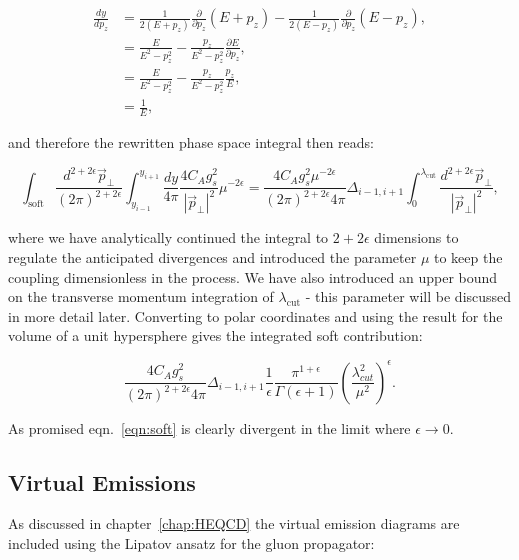 			\begin{align*}
				\frac{dy}{dp_z} &= \frac{1}{2(E+p_z)} \frac{\partial}{\partial p_z}(E+p_z) - \frac{1}{2(E-p_z)}\frac{\partial}{\partial p_z}(E-p_z),\\
				&= \frac{E}{E^2-p_z^2} - \frac{p_z}{E^2-p_z^2}\frac{\partial E}{\partial p_z},\\
				&= \frac{E}{E^2-p_z^2} - \frac{p_z}{E^2-p_z^2}\frac{p_z}{E},\\
				&= \frac{1}{E},
			\end{align*}

			and therefore the rewritten phase space integral then reads:

			\begin{equation}
				\int_{\text{soft}}\frac{d^{2+2\epsilon}\vec{p}_{\perp}}{(2\pi)^{2+2\epsilon}}\int_{y_{i-1}}^{y_{i+1}}\frac{dy}{4\pi}\frac{4C_Ag_s^2}
					{|\vec{p}_\perp|^2}\mu^{-2\epsilon} = \frac{4C_Ag_s^2\mu^{-2\epsilon}}{(2\pi)^{2+2\epsilon}4\pi}
					\Delta_{i-1, i+1}\int_0^{\lambda_{\text{cut}}}\frac{d^{2+2\epsilon}\vec{p}_{\perp}}{|\vec{p}_\perp|^2},
			\end{equation}

			where we have analytically continued the integral to $2+2\epsilon$ dimensions to regulate the anticipated
			divergences and introduced the parameter $\mu$ to keep the coupling dimensionless in the process.
			We have also introduced an upper bound on the transverse momentum integration of $\lambda_{\text{cut}}$ -
			this parameter will be discussed in more detail later.
			Converting to polar coordinates and using the result for the volume of a unit hypersphere gives
			the integrated soft contribution:

			\begin{equation}
				\frac{4C_Ag_s^2}{(2\pi)^{2+2\epsilon}4\pi}\Delta_{i-1, i+1}
				\frac{1}{\epsilon}\frac{\pi^{1+\epsilon}}
				{\Gamma(\epsilon+1)}\left(\frac{\lambda_{cut}^2}{\mu^2}\right)^\epsilon.
				\label{eqn:soft}
			\end{equation}

			As promised eqn.~\eqref{eqn:soft} is clearly divergent in the limit where $\epsilon\to0$.

	\subsection{Virtual Emissions}
		\label{sub:subsection_name}

		As discussed in chapter~\ref{chap:HEQCD} the virtual emission diagrams are included
		using the Lipatov ansatz for the gluon propagator:

